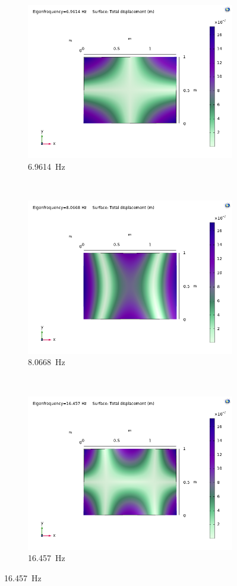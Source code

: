 \documentclass[a4paper]{article}
\begin{document}
\begin{figure}[h]
	\centering
	\begin{subfigure}[b]{0.31\linewidth}
		\includegraphics[width=0.9\linewidth]{comsol/1f.png}
		\caption*{\SI{6.9614}{\hertz}}
	\end{subfigure}
	~
	\begin{subfigure}[b]{0.31\linewidth}
		\includegraphics[width=0.9\linewidth]{comsol/2f.png}
		\caption*{\SI{8.0668}{\hertz}}
	\end{subfigure}
	~
	\begin{subfigure}[b]{0.31\linewidth}
		\includegraphics[width=0.9\linewidth]{comsol/3f.png}
		\caption*{\SI{16.457}{\hertz}}
	\end{subfigure}
	

\end{figure}
\end{document}
